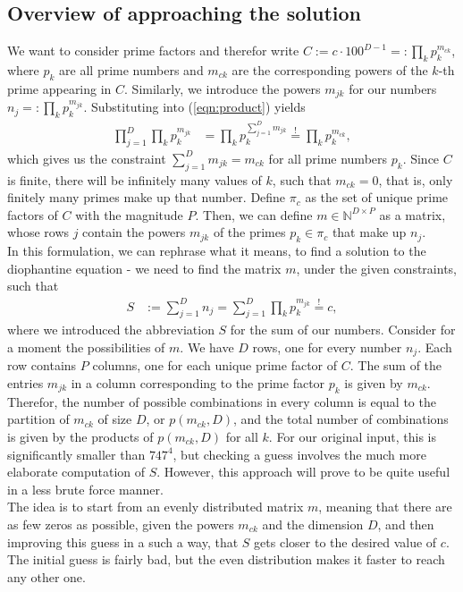 \documentclass[english, parskip=full]{scrartcl}
\begin{document}
\subsection{Overview of approaching the solution}
We want to consider prime factors and therefor write $C:=c\cdot 100^{D-1}=:\prod_kp_k^{m_{ck}}$, where $p_k$ are all prime numbers and $m_{ck}$ are the corresponding powers of the $k$-th prime appearing in $C$. Similarly, we introduce the powers $m_{jk}$ for our numbers $n_j=:\prod_kp_k^{m_{jk}}$. Substituting into (\ref{eqn:product}) yields
\begin{align*}
\prod_{j=1}^D\prod_kp_k^{m_{jk}}&=\prod_kp_k^{\sum_{j=1}^Dm_{jk}}\overset{!}{=}\prod_kp_k^{m_{ck}},
\end{align*}
which gives us the constraint $\sum_{j=1}^Dm_{jk}=m_{ck}$ for all prime numbers $p_k$. Since $C$ is finite, there will be infinitely many values of $k$, such that $m_{ck}=0$, that is, only finitely many primes make up that number. Define $\pi_c$ as the set of unique prime factors of $C$ with the magnitude $P$. Then, we can define $m\in\mathbb{N}^{D\times P}$ as a matrix, whose rows $j$ contain the powers $m_{jk}$ of the primes $p_k\in\pi_c$ that make up $n_j$.\\
In this formulation, we can rephrase what it means, to find a solution to the diophantine equation - we need to find the matrix $m$, under the given constraints, such that 
\begin{align*}
S&:=\sum_{j=1}^Dn_j=\sum_{j=1}^D\prod_kp_k^{m_{jk}}\overset{!}{=}c,
\end{align*}
where we introduced the abbreviation $S$ for the sum of our numbers. Consider for a moment the possibilities of $m$. We have $D$ rows, one for every number $n_j$. Each row contains $P$ columns, one for each unique prime factor of $C$. The sum of the entries $m_{jk}$ in a column corresponding to the prime factor $p_k$ is given by $m_{ck}$. Therefor, the number of possible combinations in every column is equal to the partition of $m_{ck}$ of size $D$, or $p(m_{ck}, D)$, and the total number of combinations is given by the products of $p(m_{ck}, D)$ for all $k$. For our original input, this is significantly smaller than $747^4$, but checking a guess involves the much more elaborate computation of $S$. However, this approach will prove to be quite useful in a less brute force manner.\\
The idea is to start from an evenly distributed matrix $m$, meaning that there are as few zeros as possible, given the powers $m_{ck}$ and the dimension $D$, and then improving this guess in a such a way, that $S$ gets closer to the desired value of $c$. The initial guess is fairly bad, but the even distribution makes it faster to reach any other one.
\end{document}
